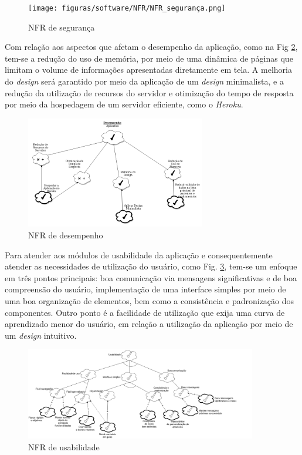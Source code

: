 \begin{figure}[H]
    \centering
    \texttt{[image: figuras/software/NFR/NFR\_segurança.png]}
    \caption{NFR de segurança}
    \label{fig:nfr-seguranca}
\end{figure}

Com relação aos aspectos que afetam o desempenho da aplicação, como na Fig \ref{fig:nfr-desempenho}, tem-se a redução do uso de memória, por meio de uma dinâmica de páginas que limitam o volume de informações apresentadas diretamente em tela. A melhoria do \emph{design} será garantido por meio da aplicação de um \emph{design} minimalista, e a redução da utilização de recursos do servidor e otimização do tempo de resposta por meio da hospedagem de um servidor eficiente, como o \textit{Heroku}.

\begin{figure}[H]
    \centering
    \includegraphics[width=0.7\textwidth, keepaspectratio]{figuras/software/NFR/NFR_desempenho.png}
    \caption{NFR de desempenho}
    \label{fig:nfr-desempenho}
\end{figure}

Para atender aos módulos de usabilidade da aplicação e consequentemente atender as necessidades de utilização do usuário, como Fig. \ref{fig:nfr-usabilidade}, tem-se um enfoque em três pontos principais: boa comunicação via mensagens significativas e de boa compreensão do usuário, implementação de uma interface simples por meio de uma boa organização de elementos, bem como a consistência e padronização dos componentes. Outro ponto é a facilidade de utilização que exija uma curva de aprendizado menor do usuário, em relação a utilização da aplicação por meio de um \textit{design} intuitivo.

\begin{figure}[H]
    \centering
    \includegraphics[width=0.9\textwidth, keepaspectratio]{figuras/software/NFR/NFR_usabilidade.png}
    \caption{NFR de usabilidade}
    \label{fig:nfr-usabilidade}
\end{figure}

